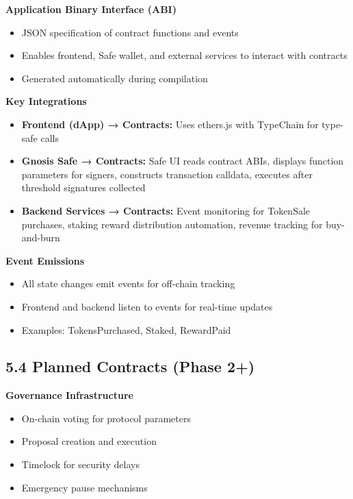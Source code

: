 \documentclass[
  paper=a4,
  ,captions=tableheading
]{scrartcl}
\providecommand{\tightlist}{%
  \setlength{\itemsep}{0pt}\setlength{\parskip}{0pt}}
\begin{document}
\textbf{Application Binary Interface (ABI)}

\begin{itemize}
\tightlist
\item
  JSON specification of contract functions and events
\item
  Enables frontend, Safe wallet, and external services to interact with contracts
\item
  Generated automatically during compilation
\end{itemize}

\textbf{Key Integrations}

\begin{itemize}
\tightlist
\item
  \textbf{Frontend (dApp) → Contracts:} Uses ethers.js with TypeChain for type-safe calls
\item
  \textbf{Gnosis Safe → Contracts:} Safe UI reads contract ABIs, displays function parameters for signers, constructs transaction calldata, executes after threshold signatures collected
\item
  \textbf{Backend Services → Contracts:} Event monitoring for TokenSale purchases, staking reward distribution automation, revenue tracking for buy-and-burn
\end{itemize}

\textbf{Event Emissions}

\begin{itemize}
\tightlist
\item
  All state changes emit events for off-chain tracking
\item
  Frontend and backend listen to events for real-time updates
\item
  Examples: TokensPurchased, Staked, RewardPaid
\end{itemize}

\subsection{5.4 Planned Contracts (Phase 2+)}\label{planned-contracts}

\textbf{Governance Infrastructure}

\begin{itemize}
\tightlist
\item
  On-chain voting for protocol parameters
\item
  Proposal creation and execution
\item
  Timelock for security delays
\item
  Emergency pause mechanisms
\end{itemize}
\end{document}
